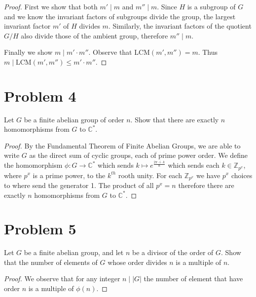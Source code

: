 \documentclass{article}
\theoremstyle{plain} %
\theoremstyle{definition} %
\newcommand{\bbZ}{\mathbb{Z}}
\begin{document}
\begin{proof}
    First we show that both $m' \mid m$ and $m'' \mid m$. Since $H$ is a
    subgroup of $G$ and we know the invariant factors of subgroups
    divide the group, the largest invariant factor $m'$ of $H$ divides $m$.
    Similarly, the invariant factors of the quotient $G/H$ also divide
    those of the ambient group, therefore $m'' \mid m$.

    Finally we show $m \mid m' \cdot m''$. Observe that
    LCM$(m', m'') = m$. Thus $m \mid \text{LCM}(m', m'') \leq m' \cdot m''$.
\end{proof}

\section*{Problem 4}
\noindent Let $G$ be a finite abelian group of order $n$. Show
that there are exactly $n$ homomorphisms from $G$ to $\mathbb{C}^*$.

\begin{proof}
   By the Fundamental Theorem of Finite Abelian Groups, we are able to
   write $G$ as the direct sum of cyclic groups, each of prime
   power order. We define the homomorphism $\phi: G \to \mathbb{C}^*$ which
   sends $k \mapsto e^{\frac{2\pi\cdot i\cdot k}{n}}$ which sends
   each $k \in \bbZ_{p^x}$, where $p^x$ is a prime power, to the $k^{th}$ rooth unity. 
   For each $\bbZ_{p^x}$ we have $p^x$ choices to where send the generator 1. The
   product of all $p^x = n$ therefore there are exactly $n$ homomorphisms
   from $G$ to $\mathbb{C}^*$. 
\end{proof}

\section*{Problem 5}
Let $G$ be a finite abelian group, and let $n$ be a divisor of
the order of $G$. Show that the number of elements of $G$ whose
order divides $n$ is a multiple of $n$.

\begin{proof}
   We observe that for any integer $n \mid |G|$ the number of 
   element that have order $n$ is a multiple of $\phi(n)$. 
\end{proof}
\end{document}
